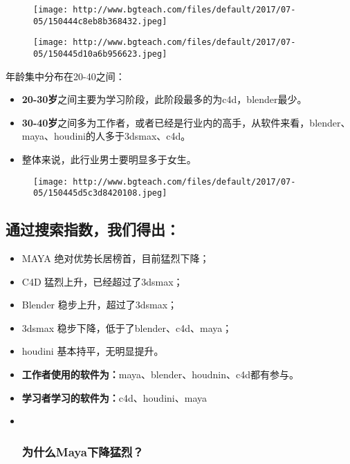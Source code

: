 \documentclass[]{article}
\begin{document}
\begin{figure}
\centering
\texttt{[image: http://www.bgteach.com/files/default/2017/07-05/150444c8eb8b368432.jpeg]}
\caption{}
\end{figure}

\begin{figure}
\centering
\texttt{[image: http://www.bgteach.com/files/default/2017/07-05/150445d10a6b956623.jpeg]}
\caption{}
\end{figure}

年龄集中分布在20-40之间：

\begin{itemize}
\item
  \textbf{20-30岁}之间主要为学习阶段，此阶段最多的为c4d，blender最少。
\item
  \textbf{30-40岁}之间多为工作者，或者已经是行业内的高手，从软件来看，blender、maya、houdini的人多于3dsmax、c4d。
\item
  整体来说，此行业男士要明显多于女生。
\end{itemize}

\begin{figure}
\centering
\texttt{[image: http://www.bgteach.com/files/default/2017/07-05/150445d5c3d8420108.jpeg]}
\caption{}
\end{figure}

\subsection{\texorpdfstring{\textbf{通过搜索指数，我们得出：}}{通过搜索指数，我们得出：}}\label{header-n95}

\begin{itemize}
\item
  MAYA 绝对优势长居榜首，目前猛烈下降；
\item
  C4D 猛烈上升，已经超过了3dsmax；
\item
  Blender 稳步上升，超过了3dsmax；
\item
  3dsmax 稳步下降，低于了blender、c4d、maya；
\item
  houdini 基本持平，无明显提升。
\item
  \textbf{工作者使用的软件为：}maya、blender、houdnin、c4d都有参与。
\item
  \textbf{学习者学习的软件为：}c4d、houdini、maya
\item ~
  \subsubsection{\texorpdfstring{\textbf{为什么Maya下降猛烈？}}{为什么Maya下降猛烈？}}\label{header-n112}
\end{itemize}
\end{document}
